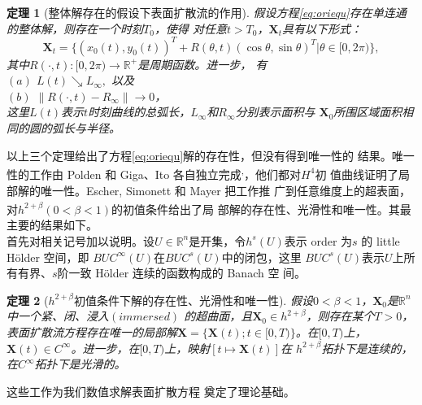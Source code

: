 \documentclass[a4paper,twoside]{ctexart}
\newtheorem{theorem}{定理}[section]
\begin{document}
\begin{theorem}[整体解存在的假设下表面扩散流的作用]
假设方程\eqref{eq:oriequ}存在单连通的整体解，则存在一个时刻$T_0$，使得
对任意$t > T_0$，$\boldsymbol X_t$具有以下形式：
$$\boldsymbol X_t = \{(x_0(t),y_0(t))^T +
R(\theta,t)(\cos{\theta},\sin{\theta})^T|\theta \in [0,2\pi) \},$$
其中$R(\cdot,t):[0,2\pi) \rightarrow \mathbb{R}^+$是周期函数。进一步，
有\\
$(a)$ $L(t) \searrow L_{\infty},$ 以及\\
$(b)$ $\left \| R(\cdot,t) - R_{\infty} \right \| \longrightarrow 0 $，\\
这里$L(t)$表示$t$时刻曲线的总弧长，$L_{\infty}$和$R_{\infty}$分别表示面积与
$\boldsymbol X_0$所围区域面积相同的圆的弧长与半径。
\end{theorem}
以上三个定理给出了方程\eqref{eq:oriequ}解的存在性，但没有得到唯一性的
结果。唯一性的工作由 Polden 和 Giga、Ito 各自独立完成\textsuperscript{\cite{ref2},\cite{ref3}}，他们都对$H^4$初
值曲线证明了局部解的唯一性。Escher, Simonett 和 Mayer 把工作推
广到任意维度上的超表面，对$h^{2+\beta}(0<\beta<1)$的初值条件给出了局
部解的存在性、光滑性和唯一性\textsuperscript{\cite{ref4}}。其最主要的结果如下。\\
\indent 首先对相关记号加以说明。设$U\in \mathbb{R}^n$是开集，令$h^s(U)$表示 order 为$s$ 的 little
Hölder 空间，即 $BUC^{\infty}(U)$在$BUC^{s}(U)$中的闭包，这里
$BUC^{s}(U)$表示$U$上所有有界、$s$阶一致 Hölder 连续的函数构成的 Banach 空
间。
\begin{theorem}[$h^{2+\beta}$初值条件下解的存在性、光滑性和唯一性]
  \label{thm:exist}
假设$0<\beta<1$，$\boldsymbol X_0$是$\mathbb{R}^n$中一个紧、闭、浸入$\left(immersed \right)$
的超曲面，且$\boldsymbol X_0 \in h^{2+\beta}$，则存在某个$T > 0$，表面扩散流方程存在唯一的局部解$\boldsymbol X =
\{ \boldsymbol X(t);t\in[0,T)\}$。在$[0,T)$上，$\boldsymbol X(t) \in
C^{\infty}$。进一步，在$[0,T)$上，映射$[t \mapsto \boldsymbol X(t)]$在
$h^{2+\beta}$拓扑下是连续的，在$C^{\infty}$拓扑下是光滑的。\\
  \end{theorem}
这些工作为我们数值求解表面扩散方程
奠定了理论基础。
\end{document}
